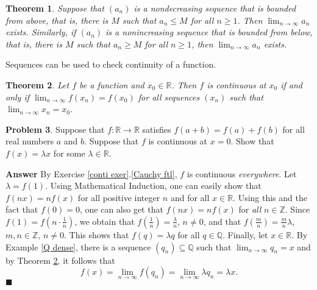\documentclass[12pt,letterpaper]{book}
\numberwithin{equation}{section}
\newtheorem{thm}{\textbf{Theorem}}[section]
\theoremstyle{definition}
\newtheorem{problem}[thm]{\textbf{Problem}}
\newenvironment{answer}{\noindent\textbf{Answer}}{\hfill$\blacksquare$\vspace{0.1in}}
\begin{document}
\begin{thm}\label{bddmonotone}
Suppose that $(a_n)$ is a nondecreasing sequence that is bounded from above, that is, there is $M$ such that $a_n\leq M$ for all $n\geq 1$. Then $\displaystyle{\lim_{n\to \infty}a_n}$ exists. Similarly, if $(a_n)$ is a nonincreasing sequence that is bounded from below, that is, there is $M$ such that $a_n\geq M$ for all $n\geq 1$, then $\displaystyle{\lim_{n\to \infty}a_n}$ exists.
\end{thm}

Sequences can be used to check continuity of a function.

\begin{thm}\label{seq conti}
Let $f$ be a function and $x_0\in \mathbb{R}$. Then $f$ is continuous at $x_0$ if and only if $\displaystyle{\lim_{n\to \infty} f(x_n)=f(x_0)}$ for all sequences $(x_n)$ such that $\displaystyle{\lim_{n\to \infty} x_n =x_0}$.
\end{thm}

\begin{problem}\label{cauchy functional equation} Suppose that $f:\mathbb{R}\to \mathbb{R}$ satisfies $f(a+b)=f(a)+f(b)$ for all real numbers $a$ and $b$. Suppose that $f$ is continuous at $x=0$. Show that $f(x)=\lambda x$ for some $\lambda\in \mathbb{R}$.
\end{problem}

\begin{answer} By Exercise \ref{conti exer}.\ref{Cauchy ftl}, $f$ is continuous \textit{everywhere}. Let $\lambda=f(1)$. Using Mathematical Induction, one can easily show that $f(nx)=nf(x)$ for all positive integer $n$ and for all $x\in \mathbb{R}$. Using this and the fact that $f(0)=0$, one can also get that $f(nx)=nf(x)$ for \textit{all} $n\in \mathbb{Z}$. Since $f(1)=f(n\cdot\frac{1}{n})$, we obtain that $f(\frac{1}{n})=\frac{\lambda}{n}$, $n\neq 0$, and that $f(\frac{m}{n})=\frac{m}{n}\lambda$, $m,n\in \mathbb{Z}$, $n\neq 0$. This shows that $f(q)=\lambda q$ for all $q\in \mathbb{Q}$. Finally, let $x\in \mathbb{R}$. By Example \ref{Q dense}, there is a sequence $(q_n)\subseteq \mathbb{Q}$ such that $\displaystyle{\lim_{n\to \infty} q_n =x}$ and by Theorem \ref{seq conti}, it follows that
$$f(x)=\lim_{n\to \infty}f(q_n)=\lim_{n\to \infty} \lambda q_n =\lambda x.$$
\end{answer}
\end{document}
